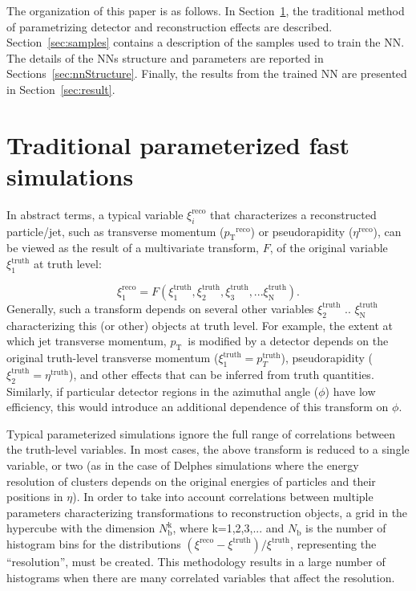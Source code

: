 \documentclass[showpacs,showkeys,preprint,prd,nofootinbib,linenumbers,12pt,superscriptaddress]{revtex4-1}
\def\pt{\ensuremath{p_{\mathrm{T}}}}
\def\genRes{\ensuremath{(\xi^{\mathrm{reco}}-\xi^{\mathrm{truth}})/\xi^{\mathrm{truth}}}}
\begin{document}
The organization of this paper is as follows. In Section~\ref{sec:tradMethod}, the traditional method of parametrizing detector and reconstruction effects are described. Section~\ref{sec:samples} contains a description of the samples used to train the NN. The details of the NNs structure and parameters are reported in Sections~\ref{sec:nnStructure}. Finally, the results from the trained NN are presented in Section~\ref{sec:result}.

\FloatBarrier
\section{Traditional parameterized fast simulations}
\label{sec:tradMethod}
In abstract terms, a typical variable $\xi_i^{\mathrm{reco}}$ that characterizes a reconstructed particle/jet, such as transverse momentum (\pt$^{\mathrm{reco}}$) or pseudorapidity ($\eta^{\mathrm{reco}}$), can be viewed as the result of a multivariate transform, $F$, of the original variable $\xi_1^{\mathrm{truth}}$ at truth level:

$$
\xi_1^{\mathrm{reco}} = F (\xi_1^{\mathrm{truth}}, \xi_2^{\mathrm{truth}}, \xi_3^{\mathrm{truth}}, ...\xi_{\mathrm{N}}^{\mathrm{truth}}).
$$
Generally, such a transform  depends on several other variables $\xi_2^{\mathrm{truth}}$ ..  $\xi_{\mathrm{N}}^{\mathrm{truth}}$ characterizing this (or other) objects at truth level. For example, the extent at which jet transverse momentum, \pt\ is modified by a detector depends on the original truth-level transverse momentum ($\xi_1^{\mathrm{truth}}=p_T^{\mathrm{truth}}$), pseudorapidity ($\xi_2^{\mathrm{truth}}=\eta^{\mathrm{truth}}$), and other effects that can be inferred from truth quantities. Similarly, if particular detector regions in the azimuthal angle ($\phi$) have low efficiency, this would introduce an additional dependence of this transform on $\phi$.

Typical parameterized simulations ignore the full range of correlations between the truth-level variables. In most cases, the above transform is reduced to a single variable, or two (as in the case of Delphes simulations where the energy resolution of clusters depends on the original energies of particles and their positions in $\eta$). In order to take into account correlations between multiple parameters characterizing transformations to reconstruction objects, a grid in the hypercube with the dimension $N_{\mathrm{b}}^{\mathrm{k}}$, where k=1,2,3,... and $N_{\mathrm{b}}$ is the number of histogram bins for the distributions \genRes, representing the ``resolution'', must be created. This methodology results in a large number of histograms when there are many correlated variables that affect the resolution.
\end{document}
